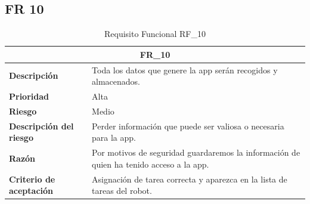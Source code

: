 \documentclass{scrreprt}
\begin{document}
\subsection{FR 10}
    \begin{table}[H]
        \label{tab:my-table}
        \begin{tabular}{|p{5cm}|p{11cm}|}
        \hline
        \multicolumn{2}{|c|}{\textbf{FR_10}} \\
        \hline
        \textbf{Descripción  }                      &  Toda los datos que genere la app serán recogidos y almacenados.                                                                      \\ \hline
        \textbf{Prioridad}                          & Alta                                                                                              \\ \hline
        \textbf{Riesgo}                          & Medio                                                                                                \\ \hline
        \textbf{Descripción del riesgo}                    &  Perder información que puede ser valiosa o necesaria para la app.                                \\ \hline
        \textbf{Razón}                   & Por motivos de seguridad guardaremos la información de quien ha tenido acceso a la app.                                                                                                                \\ \hline
         \textbf{Criterio de aceptación}                    & Asignación de tarea correcta y aparezca en la lista de tareas del robot.  \\ \hline
        \end{tabular}%
        
        \caption{Requisito Funcional RF_10}
\end{table}
\end{document}
